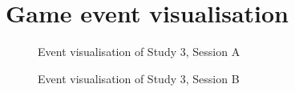 \section{Game event visualisation}
\begin{figure}[H]
  \centering
  \caption{Event visualisation of Study 3, Session A}
\end{figure}

\begin{figure}[H]
  \centering
  \caption{Event visualisation of Study 3, Session B}
\end{figure}